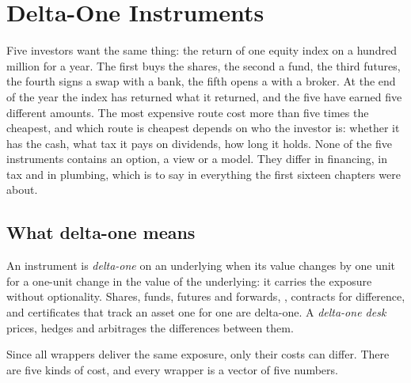 \chapter{Delta-One Instruments}\label{ch:m1:delta-one-instruments}

Five investors want the same thing: the return of one equity index on a
hundred million for a year. The first buys the shares, the second a fund, the
third futures, the fourth signs a swap with a bank, the fifth opens a
 with a broker. At the end of the year the index has
returned what it returned, and the five have earned five different amounts.
The most expensive route cost more than five times the cheapest, and which route is
cheapest depends on who the investor is: whether it has the cash, what tax
it pays on dividends, how long it holds. None of the five instruments
contains an option, a view or a model. They differ in financing, in tax and in
plumbing, which is to say in everything the first sixteen chapters were
about.

\section{What delta-one means}

\begin{definition}\label{def:m1:delta-one-instruments:deltaone}
An instrument is \emph{delta-one} on an underlying when its
value changes by one unit for a one-unit change in the value of the
underlying: it carries the exposure without optionality. Shares, funds,
futures and forwards, , contracts for difference,
 and certificates that track an asset one for one are
delta-one. A \emph{delta-one desk} prices, hedges and arbitrages the
differences between them.
\end{definition}

Since all wrappers deliver the same exposure, only their costs can differ.
There are five kinds of cost, and every wrapper is a vector of five numbers.

